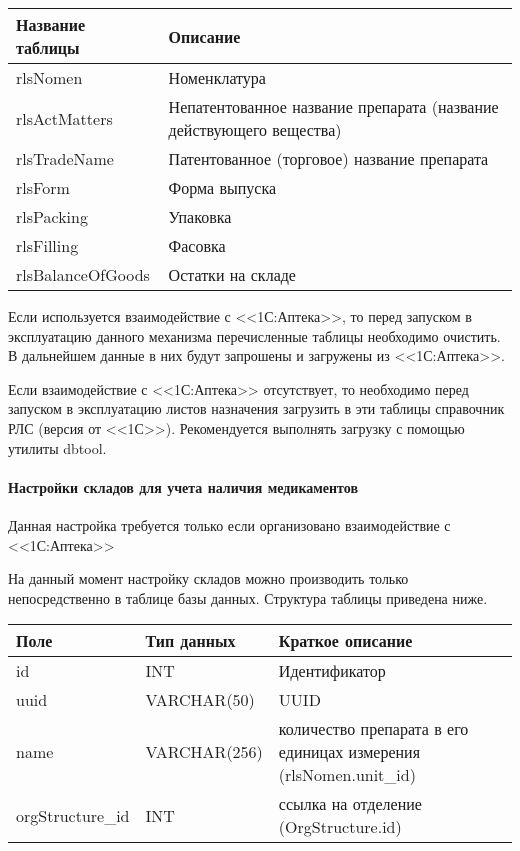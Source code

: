 \begin{table}[h]
\small
{} \label{tbl_oth_rls} 
 \begin{tabular}{|p{5.5cm}|p{11.3cm}|}
  \hline \rule{0pt}{15pt} \centering \textbf{Название таблицы} & \hfil \textbf{Описание} \\ \hline
  rlsNomen &	Номенклатура \\ \hline
  rlsActMatters	& Непатентованное название препарата (название действующего вещества)  \\ \hline
  rlsTradeName	& Патентованное (торговое) название препарата \\ \hline
  rlsForm	& Форма выпуска  \\ \hline
  rlsPacking	& Упаковка \\ \hline
  rlsFilling	& Фасовка  \\ \hline
  rlsBalanceOfGoods & Остатки на складе \\ \hline
 \end{tabular}
\end{table}

Если используется взаимодействие с <<1С:Аптека>>, то перед запуском в эксплуатацию данного механизма перечисленные таблицы необходимо очистить. В дальнейшем данные в них будут запрошены и загружены из <<1С:Аптека>>.

Если взаимодействие с <<1С:Аптека>> отсутствует, то необходимо перед запуском в эксплуатацию листов назначения загрузить в эти таблицы справочник РЛС (версия от <<1С>>). Рекомендуется выполнять загрузку с помощью утилиты dbtool.

\paragraph{Настройки складов для учета наличия медикаментов}

\begin{vnim}
 Данная настройка требуется только если организовано взаимо\-дей\-ствие с <<1С:Аптека>>
\end{vnim}
 
На данный момент настройку складов можно производить только непосредственно в таблице  базы данных. Структура таблицы приведена ниже.

\begin{table}
\small
{} \label{tbl_oth_rbstor} 
 \begin{tabular}{|p{4cm}|p{4cm}|p{8.7cm}|}
  \hline \rule{0pt}{15pt} \centering \textbf{Поле} & \centering \textbf{Тип данных} & \hfil \textbf{Краткое описание} \\ \hline
  id &	INT &	Идентификатор  \\ \hline
  uuid &	VARCHAR(50) &	UUID \\ \hline 
  name &	VARCHAR(256) &	количество препарата в его единицах измерения (rlsNomen.unit\_id)  \\ \hline
  orgStructure\_id &	INT &	ссылка на отделение (OrgStructure.id)  \\ \hline  
 \end{tabular}
\end{table}

